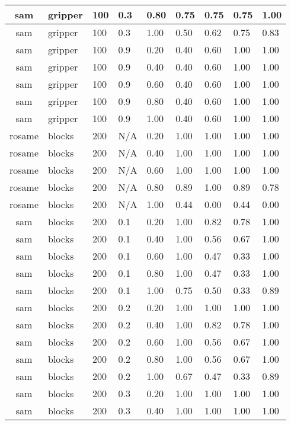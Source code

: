 \begin{table}[ht]
\begin{tabular}{c}
sam & gripper & 100 & 0.3 & 0.80 & 0.75 & 0.75 & 0.75 & 1.00 \\ \hline
sam & gripper & 100 & 0.3 & 1.00 & 0.50 & 0.62 & 0.75 & 0.83 \\ \hline
sam & gripper & 100 & 0.9 & 0.20 & 0.40 & 0.60 & 1.00 & 1.00 \\ \hline
sam & gripper & 100 & 0.9 & 0.40 & 0.40 & 0.60 & 1.00 & 1.00 \\ \hline
sam & gripper & 100 & 0.9 & 0.60 & 0.40 & 0.60 & 1.00 & 1.00 \\ \hline
sam & gripper & 100 & 0.9 & 0.80 & 0.40 & 0.60 & 1.00 & 1.00 \\ \hline
sam & gripper & 100 & 0.9 & 1.00 & 0.40 & 0.60 & 1.00 & 1.00 \\ \hline
rosame & blocks & 200 & N/A & 0.20 & 1.00 & 1.00 & 1.00 & 1.00 \\ \hline
rosame & blocks & 200 & N/A & 0.40 & 1.00 & 1.00 & 1.00 & 1.00 \\ \hline
rosame & blocks & 200 & N/A & 0.60 & 1.00 & 1.00 & 1.00 & 1.00 \\ \hline
rosame & blocks & 200 & N/A & 0.80 & 0.89 & 1.00 & 0.89 & 0.78 \\ \hline
rosame & blocks & 200 & N/A & 1.00 & 0.44 & 0.00 & 0.44 & 0.00 \\ \hline
sam & blocks & 200 & 0.1 & 0.20 & 1.00 & 0.82 & 0.78 & 1.00 \\ \hline
sam & blocks & 200 & 0.1 & 0.40 & 1.00 & 0.56 & 0.67 & 1.00 \\ \hline
sam & blocks & 200 & 0.1 & 0.60 & 1.00 & 0.47 & 0.33 & 1.00 \\ \hline
sam & blocks & 200 & 0.1 & 0.80 & 1.00 & 0.47 & 0.33 & 1.00 \\ \hline
sam & blocks & 200 & 0.1 & 1.00 & 0.75 & 0.50 & 0.33 & 0.89 \\ \hline
sam & blocks & 200 & 0.2 & 0.20 & 1.00 & 1.00 & 1.00 & 1.00 \\ \hline
sam & blocks & 200 & 0.2 & 0.40 & 1.00 & 0.82 & 0.78 & 1.00 \\ \hline
sam & blocks & 200 & 0.2 & 0.60 & 1.00 & 0.56 & 0.67 & 1.00 \\ \hline
sam & blocks & 200 & 0.2 & 0.80 & 1.00 & 0.56 & 0.67 & 1.00 \\ \hline
sam & blocks & 200 & 0.2 & 1.00 & 0.67 & 0.47 & 0.33 & 0.89 \\ \hline
sam & blocks & 200 & 0.3 & 0.20 & 1.00 & 1.00 & 1.00 & 1.00 \\ \hline
sam & blocks & 200 & 0.3 & 0.40 & 1.00 & 1.00 & 1.00 & 1.00 \\ \hline

\end{tabular}
\end{table}
